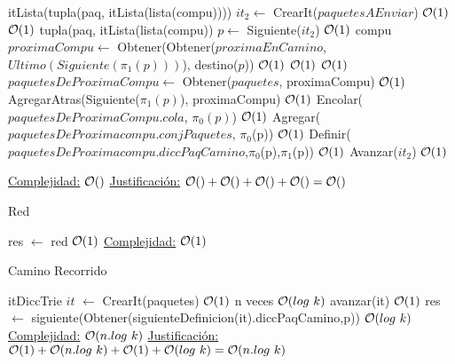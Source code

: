\begin{Algoritmos}
\begin{algorithm}
\begin{algorithmic}[1]
  \State itLista(tupla(paq, itLista(lista(compu)))) $it_2 \gets$ CrearIt($paquetesAEnviar$) \Comment  $\mathcal{O}(1)$
   \Comment  $\mathcal{O}(1)$
      \State tupla(paq, itLista(lista(compu)) $p \gets$ Siguiente($it_2$) \Comment  $\mathcal{O}(1)$
      \State compu $proximaCompu \gets$ Obtener(Obtener($proximaEnCamino$, $Ultimo(Siguiente(\pi_1(p)))$), destino($p$)) \Comment  $\mathcal{O}(1)$
       \Comment  $\mathcal{O}(1)$ \Comment  $\mathcal{O}(1)$
	\State $paquetesDeProximaCompu \gets$ Obtener($paquetes$, proximaCompu) \Comment  $\mathcal{O}(1)$
      	\State AgregarAtras(Siguiente($\pi_1(p)$), proximaCompu) \Comment  $\mathcal{O}(1)$
      	\State Encolar($paquetesDeProximaCompu$.$cola$, $\pi_0(p)$) \Comment  $\mathcal{O}(1)$
      	\State Agregar($paquetesDeProximacompu$.$conjPaquetes$, $\pi_0$(p)) \Comment  $\mathcal{O}(1)$
	\State Definir($paquetesDeProximacompu.diccPaqCamino$,$\pi_0$(p),$\pi_1$(p)) \Comment  $\mathcal{O}(1)$
      \EndIf
      \State Avanzar($it_2$) \Comment  $\mathcal{O}(1)$
  \EndWhile
 
 \EndProcedure
     \underline{Complejidad:} $\mathcal{O}()$
 \underline{Justificación:} $\mathcal{O}()+\mathcal{O}()+\mathcal{O}()+\mathcal{O}() = \mathcal{O}()$
 \end{algorithmic}
\end{algorithm}



\begin{algorithm}
\caption{Red}
\begin{algorithmic}[1]
 \State res $\gets$ red \Comment $\mathcal{O}(1)$
 \EndProcedure
   \underline{Complejidad:} $\mathcal{O}(1)$
\end{algorithmic}
\end{algorithm}

\begin{algorithm}
\caption{Camino Recorrido}
\begin{algorithmic}[1]
   \State itDiccTrie $it$ $\gets$ CrearIt(paquetes) \Comment $\mathcal{O}(1)$
    \Comment n veces $\mathcal{O}(log \ k)$
   \State avanzar(it) \Comment $\mathcal{O}(1)$
   \EndWhile
   \State res $\gets$ siguiente(Obtener(siguienteDefinicion(it).diccPaqCamino,p)) \Comment $\mathcal{O}(log \ k)$
  \EndProcedure
   \underline{Complejidad:} $\mathcal{O}(n.log \ k)$
 \underline{Justificación:} $\mathcal{O}(1)+\mathcal{O}(n.log \ k)+\mathcal{O}(1)+\mathcal{O}(log \ k) = \mathcal{O}(n.log \ k)$
\end{algorithmic}
\end{algorithm}



\end{Algoritmos}

